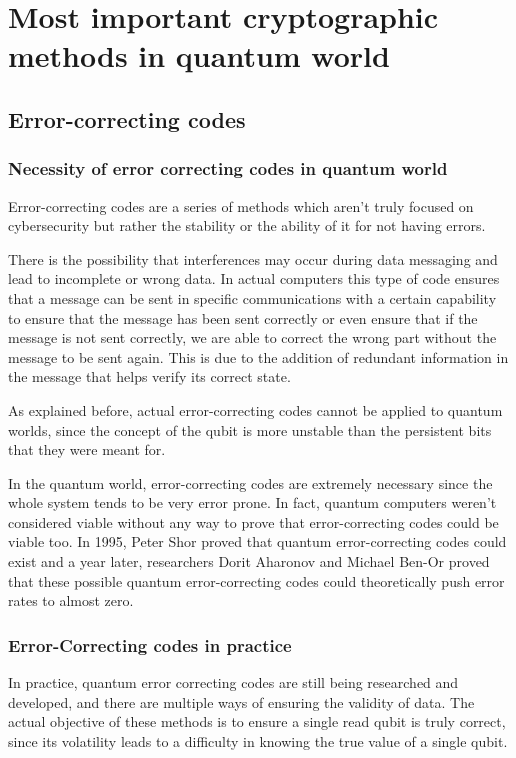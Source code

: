 \pagebreak
\section{Most important cryptographic methods in quantum world}

\subsection{Error-correcting codes}
\subsubsection{Necessity of error correcting codes in quantum world}

Error-correcting codes are a series of methods which aren't truly focused on
cybersecurity but rather the stability or the ability of it for not having
errors.

There is the possibility that interferences may occur during data messaging and
lead to incomplete or wrong data. In actual computers this type of code ensures
that a message can be sent in specific communications with a certain capability
to ensure that the message has been sent correctly or even ensure that if the
message is not sent correctly, we are able to correct the wrong part without the
message to be sent again. This is due to the addition of redundant information
in the message that helps verify its correct state.

As explained before, actual error-correcting codes cannot be applied to quantum
worlds, since the concept of the qubit is more unstable than the persistent bits
that they were meant for.

In the quantum world, error-correcting codes are extremely necessary since the
whole system tends to be very error prone. In fact, quantum computers weren't
considered viable without any way to prove that error-correcting codes could be
viable too. In 1995, Peter Shor proved that quantum error-correcting codes could
exist and a year later, researchers Dorit Aharonov and Michael Ben-Or proved
that these possible quantum error-correcting codes could theoretically push
error rates to almost zero.

\subsubsection{Error-Correcting codes in practice}

In practice, quantum error correcting codes are still being researched and
developed, and there are multiple ways of ensuring the validity of data. The
actual objective of these methods is to ensure a single read qubit is truly
correct, since its volatility leads to a difficulty in knowing the true value of
a single qubit.


